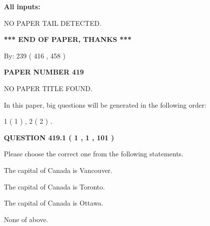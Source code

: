 \documentclass[12pt]{article}
\begin{document}
   
   
   
\noindent\vspace{0.1in}\hspace{-0.08in} {\textbf{\Large{All inputs: }}}
   
   
   
   
\vspace{2.0in} NO PAPER TAIL DETECTED.
   
   
   
   
\vspace{1.0in} 
{\textbf{\large{ *** END OF PAPER, THANKS *** }}} 
   
   
\hspace{1.0in} By: 
 239 ( 416 ,  458 )
   
   
   
   
\newpage 
\setcounter{page}{ 
   419001 } 
   
   
   
   
 {\textbf{ \Large{ PAPER NUMBER  419  }}}
   
   
\vspace{0.2in}
   
   
   
   
   
   
 NO PAPER TITLE FOUND.
   
   
   
\vspace{0.2in}
   
In this paper, big questions will be generated in the following order: 
   
   
   1 ( 1 )
 ,
   2 ( 2 )
 .
  
\vspace{0.2in}
  
{\textbf{\Large{QUESTION
419.1 
 ( 1 , 1 , 101 )
}}}
  
  
Please choose the correct one from the following statements.
 
 
The capital of Canada is Vancouver.
 
 
The capital of Canada is Toronto.
 
 
The capital of Canada is Ottawa.
 
 
 None of above.
 
 
\noindent{}
 
\end{document}
